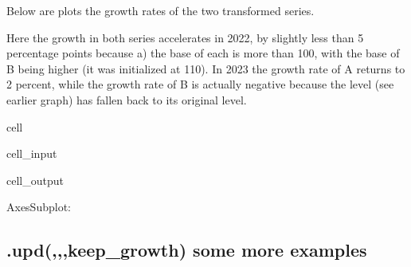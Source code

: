 \documentclass[letterpaper,10pt,english]{jupyterBook}
\begin{document}
\sphinxAtStartPar
Below are plots the growth rates of the two transformed series.

\sphinxAtStartPar
Here the growth in both series accelerates in 2022, by slightly less than 5 percentage points because a) the base of each is more than 100, with the base of B being higher (it was initialized at 110). In 2023 the growth rate of A returns to 2 percent, while the growth rate of B is actually negative because the level (see earlier graph) has fallen back to its original level.

\begin{sphinxuseclass}{cell}\begin{sphinxVerbatimInput}

\begin{sphinxuseclass}{cell_input}
\begin{sphinxVerbatim}[commandchars=\\\{\}]
\PYG{p}{[}\PYG{p}{[}\PYG{p}{]}\PYG{p}{]}
\end{sphinxVerbatim}

\end{sphinxuseclass}\end{sphinxVerbatimInput}
\begin{sphinxVerbatimOutput}

\begin{sphinxuseclass}{cell_output}
\begin{sphinxVerbatim}[commandchars=\\\{\}]
\PYGZlt{}AxesSubplot:\PYGZgt{}
\end{sphinxVerbatim}

\noindent{}

\end{sphinxuseclass}\end{sphinxVerbatimOutput}

\end{sphinxuseclass}

\subsection{.upd(,,,keep\_growth) some more examples}
\label{\detokenize{content/04_PythonEssentials/UpdateCommand:upd-keep-growth-some-more-examples}}
\end{document}
